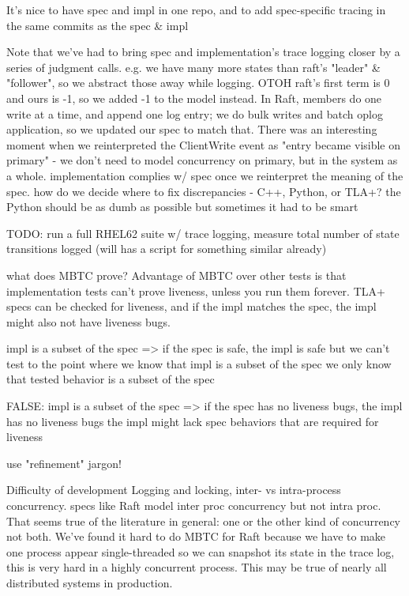 \documentclass{vldb}
\begin{document}
It's nice to have spec and impl in one repo, and to add spec-specific tracing in the same commits as the spec & impl

Note that we've had to bring spec and implementation's trace logging closer by a series of judgment calls. e.g. we have many more states than raft's "leader" & "follower", so we abstract those away while logging. OTOH raft's first term is 0 and ours is -1, so we added -1 to the model instead. In Raft, members do one write at a time, and append one log entry; we do bulk writes and batch oplog application, so we updated our spec to match that. There was an interesting moment when we reinterpreted the ClientWrite event as "entry became visible on primary" - we don't need to model concurrency on primary, but in the system as a whole. implementation complies w/ spec once we reinterpret the meaning of the spec. how do we decide where to fix discrepancies - C++, Python, or TLA+? the Python should be as dumb as possible but sometimes it had to be smart

TODO: run a full RHEL62 suite w/ trace logging, measure total number of state transitions logged (will has a script for something similar already)

what does MBTC prove?
Advantage of MBTC over other tests is that implementation tests can't prove liveness, unless you run them forever. TLA+ specs can be checked for liveness, and if the impl matches the spec, the impl might also not have liveness bugs.

impl is a subset of the spec => if the spec is safe, the impl is safe
but we can't test to the point where we know that impl is a subset of the spec
we only know that tested behavior is a subset of the spec

FALSE: impl is a subset of the spec => if the spec has no liveness bugs, the impl has no liveness bugs
the impl might lack spec behaviors that are required for liveness

use "refinement" jargon!

Difficulty of development
Logging and locking, inter- vs intra-process concurrency. specs like Raft model inter proc concurrency but not intra proc. That seems true of the literature in general: one or the other kind of concurrency not both. We've found it hard to do MBTC for Raft because we have to make one process appear single-threaded so we can snapshot its state in the trace log, this is very hard in a highly concurrent process. This may be true of nearly all distributed systems in production.
\end{document}
